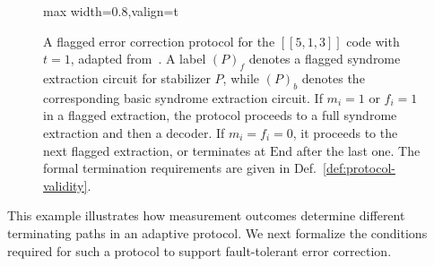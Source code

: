 \documentclass[acmsmall,screen,review,anonymous,nonacm]{acmart}
\begin{document}
\begin{figure}[tb]
\begin{adjustbox}{max width=0.8\textwidth,valign=t}
    \end{adjustbox}

    \caption{A flagged error correction protocol for the $[[5,1,3]]$ code with $t=1$, adapted from~\cite{CR18a}. A label $(P)_f$ denotes a flagged syndrome extraction circuit for stabilizer $P$, while $(P)_b$ denotes the corresponding basic syndrome extraction circuit. If $m_i=1$ or $f_i=1$ in a flagged extraction, the protocol proceeds to a full syndrome extraction and then a decoder. If $m_i=f_i=0$, it proceeds to the next flagged extraction, or terminates at $\mathrm{End}$ after the last one. The formal termination requirements are given in Def.~\ref{def:protocol-validity}.}
    \label{fig:five-qubit-flagged-protocol}
\end{figure}

This example illustrates how measurement outcomes determine different terminating paths in an adaptive protocol. We next formalize the conditions required for such a protocol to support fault-tolerant error correction.
\end{document}
